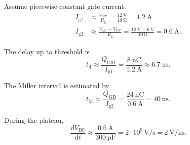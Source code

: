 \FloatBarrier

Assume piecewise-constant gate current:
\begin{align*}
    I_\mathrm{g1} &\approx \frac{V_\mathrm{drv}}{R_\mathrm{g}} = \frac{\SI{12}{\volt}}{\SI{10}{\ohm}} = \SI{1.2}{\ampere} \\
    I_\mathrm{g2} &\approx \frac{V_\mathrm{drv} - V_\mathrm{GP}}{R_\mathrm{g}}
    = \frac{\SI{12}{\volt} - \SI{6}{\volt}}{\SI{10}{\ohm}} = \SI{0.6}{\ampere}.
\end{align*}


\begin{solutionblock}
    The delay up to threshold is
    \begin{equation}
        t_\mathrm{d} \approx \frac{Q_\mathrm{GS1}}{I_\mathrm{g1}}
        = \frac{\SI{8}{\nano\coulomb}}{\SI{1.2}{\ampere}}
        \approx \SI{6.7}{\nano\second}.
    \end{equation}
\end{solutionblock}


\begin{solutionblock}
    The Miller interval is estimated by
    \begin{equation}
        t_\mathrm{M} \approx \frac{Q_\mathrm{GD}}{I_\mathrm{g2}}
        = \frac{\SI{24}{\nano\coulomb}}{\SI{0.6}{\ampere}}
        = \SI{40}{\nano\second}.
    \end{equation}
\end{solutionblock}


\begin{solutionblock}
    During the plateau,
    \begin{equation}
        \frac{\mathrm{d}V_\mathrm{DS}}{\mathrm{d}t}
        \approx \frac{\SI{0.6}{\ampere}}{\SI{300}{\pico\farad}}
        = 2 \cdot 10^9 \,\si{\volt\per\second}
        = \SI{2}{\volt\per\nano\second}.
    \end{equation}
\end{solutionblock}


